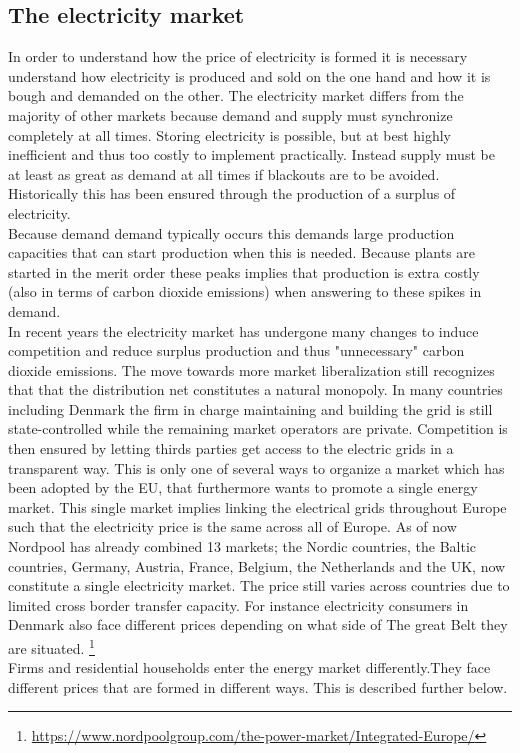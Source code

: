 \label{sec:theory}

\subsection{The electricity market}
\label{subsec:t_market}
In order to understand how the price of electricity is formed it is necessary understand how electricity is produced and sold on the one hand and how it is bough and demanded on the other. The electricity market differs from the majority of other markets because demand and supply must synchronize completely at all times. Storing electricity is possible, but at best highly inefficient and thus too costly to implement practically. Instead supply must be at least as great as demand at all times if blackouts are to be avoided. Historically this has been ensured through the production of a surplus of electricity. \smallskip\\

Because demand demand typically occurs this demands large production capacities that can start production when this is needed. Because plants are started in the merit order these peaks implies that production is extra costly (also in terms of carbon dioxide emissions) when answering to these spikes in demand. 
\smallskip\\

In recent years the electricity market has undergone many changes to induce competition and reduce surplus production and thus "unnecessary" carbon dioxide emissions. The move towards more market liberalization still recognizes that that the distribution net constitutes a natural monopoly. In many countries including Denmark the firm in charge maintaining and building the grid is still state-controlled while the remaining market operators are private. Competition is then ensured by letting thirds parties get access to the electric grids in a transparent way. This is only one of several ways to organize a market which has been adopted by the EU, that furthermore wants to promote a single energy market. This single market  implies linking the electrical grids throughout Europe such that the electricity price is the same across all of Europe. As of now Nordpool has already combined 13 markets; the Nordic countries, the Baltic countries, Germany, Austria, France, Belgium, the Netherlands and the UK, now constitute a single electricity market. The price still varies across countries due to limited cross border transfer capacity. For instance electricity consumers in Denmark also face different prices depending on what side of The great Belt they are situated. \footnote{\url{https://www.nordpoolgroup.com/the-power-market/Integrated-Europe/}} \smallskip \\
Firms and residential households enter the energy market differently.They face different prices that are formed in different ways. This is described further below.  

